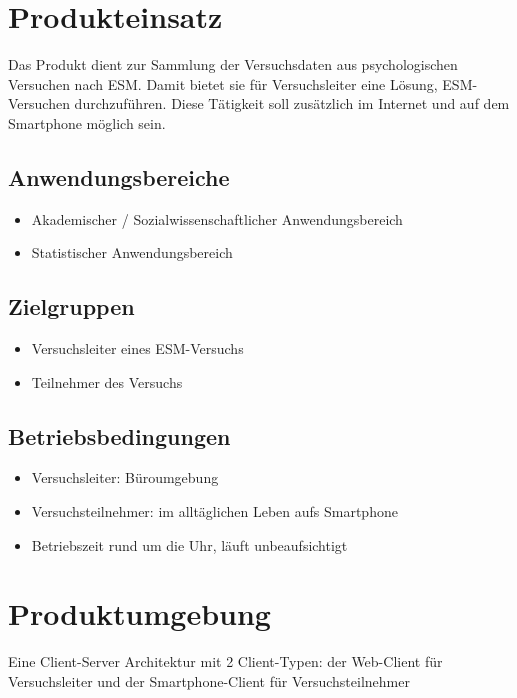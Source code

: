 \documentclass[a4paper]{scrreprt}
\begin{document}
    \chapter{Produkteinsatz}
        Das Produkt dient zur Sammlung der Versuchsdaten aus psychologischen Versuchen nach ESM. Damit bietet sie für Versuchsleiter eine Lösung, ESM-Versuchen durchzuführen. Diese Tätigkeit soll zusätzlich im Internet und auf dem Smartphone möglich sein.

        \section{Anwendungsbereiche}
            \begin{itemize}
                \item Akademischer / Sozialwissenschaftlicher Anwendungsbereich
                \item Statistischer Anwendungsbereich
            \end{itemize}

        \section{Zielgruppen}
            \begin{itemize}
                \item Versuchsleiter eines ESM-Versuchs
                \item Teilnehmer des Versuchs
            \end{itemize}

        \section{Betriebsbedingungen}
            \begin{itemize}
                \item Versuchsleiter: Büroumgebung
                \item Versuchsteilnehmer: im alltäglichen Leben aufs Smartphone
                \item Betriebszeit rund um die Uhr, läuft unbeaufsichtigt
            \end{itemize}

    \chapter{Produktumgebung}
        Eine Client-Server Architektur mit 2 Client-Typen: der Web-Client für Versuchsleiter und der Smartphone-Client für Versuchsteilnehmer
\end{document}
